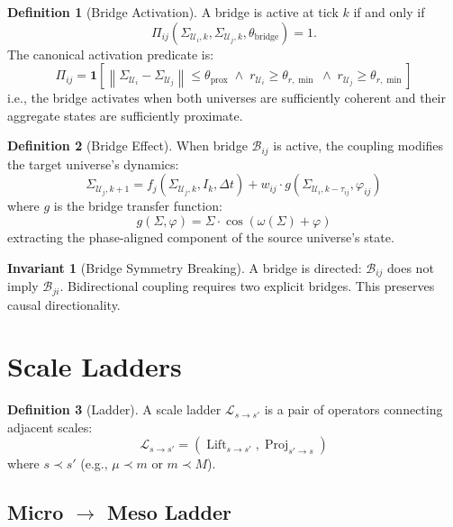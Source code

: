 \documentclass[11pt,a4paper,twoside]{article}
\theoremstyle{definition}
\newtheorem{definition}{Definition}[section]
\newtheorem{invariant}{Invariant}[section]
\theoremstyle{plain}
\theoremstyle{remark}
\newcommand{\calL}{\mathcal{L}}
\newcommand{\calB}{\mathcal{B}}
\newcommand{\calU}{\mathcal{U}}
\DeclareMathOperator{\Lift}{Lift}
\DeclareMathOperator{\Proj}{Proj}
\newcommand{\norm}[1]{\left\lVert #1 \right\rVert}
\begin{document}
\begin{definition}[Bridge Activation]\label{def:bridgeact}
A bridge is active at tick $k$ if and only if
\[
  \Pi_{ij}(\Sigma_{\calU_i,k}, \Sigma_{\calU_j,k}, \theta_{\mathrm{bridge}})
  = 1.
\]
The canonical activation predicate is:
\[
  \Pi_{ij} = \mathbf{1}\!\left[
    \norm{\Sigma_{\calU_i} - \Sigma_{\calU_j}} \le \theta_{\mathrm{prox}}
    \;\wedge\;
    r_{\calU_i} \ge \theta_{r,\min}
    \;\wedge\;
    r_{\calU_j} \ge \theta_{r,\min}
  \right]
\]
i.e., the bridge activates when both universes are sufficiently coherent
and their aggregate states are sufficiently proximate.
\end{definition}

\begin{definition}[Bridge Effect]\label{def:bridgeeff}
When bridge $\calB_{ij}$ is active, the coupling modifies the target
universe's dynamics:
\[
  \Sigma_{\calU_j,k+1} = f_j(\Sigma_{\calU_j,k}, I_k, \Delta t)
  + w_{ij} \cdot g(\Sigma_{\calU_i, k - \tau_{ij}}, \varphi_{ij})
\]
where $g$ is the bridge transfer function:
\[
  g(\Sigma, \varphi) = \Sigma \cdot \cos(\omega(\Sigma) + \varphi)
\]
extracting the phase-aligned component of the source universe's state.
\end{definition}

\begin{invariant}[Bridge Symmetry Breaking]\label{inv:bridgesym}
A bridge is directed: $\calB_{ij}$ does not imply $\calB_{ji}$.
Bidirectional coupling requires two explicit bridges. This preserves
causal directionality.
\end{invariant}


\section{Scale Ladders}\label{sec:ladders}

\begin{definition}[Ladder]\label{def:ladder}
A scale ladder $\calL_{s \to s'}$ is a pair of operators connecting
adjacent scales:
\[
  \calL_{s \to s'} = (\Lift_{s \to s'}, \Proj_{s' \to s})
\]
where $s \prec s'$ (e.g., $\mu \prec m$ or $m \prec M$).
\end{definition}

\subsection{Micro $\to$ Meso Ladder}
\end{document}
